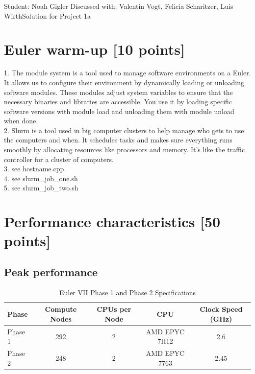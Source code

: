 \documentclass[unicode,11pt,a4paper,oneside,numbers=endperiod,openany]{scrartcl}
\begin{document}
\setassignment
{}

            {Student: Noah Gigler}
            {Discussed with: Valentin Vogt, Felicia Scharitzer, Luis Wirth}{Solution for Project 1a}{}
\newline

\assignmentpolicy

\section{Euler warm-up [10 points]}

1. The module system is a tool used to manage software environments on a Euler. 
It allows us to configure their environment by dynamically loading or unloading software modules. 
These modules adjust system variables to ensure that the necessary binaries and libraries are accessible.
You use it by loading specific software versions with module load and unloading them with module unload when done.
\\
2. Slurm is a tool used in big computer clusters to help manage who gets to use the computers and when. 
It schedules tasks and makes sure everything runs smoothly by allocating resources like processors and memory.
It's like the traffic controller for a cluster of computers.
\\
3.
see hostname.cpp
\\
4.
see slurm\_job\_one.sh
\\
5.
see slurm\_job\_two.sh

\section{Performance characteristics [50 points]}

\subsection{Peak performance}

\begin{table}[ht]
\centering
\caption{Euler VII Phase 1 and Phase 2 Specifications}
\begin{tabular}{|l|c|c|c|c|}
\hline
\textbf{Phase} & \textbf{Compute Nodes} & \textbf{CPUs per Node} & \textbf{CPU} & \textbf{Clock Speed (GHz)} \\ \hline
Phase 1        & 292                    & 2                      & AMD EPYC 7H12 & 2.6                        \\ \hline
Phase 2        & 248                    & 2                      & AMD EPYC 7763 & 2.45                       \\ \hline
\end{tabular}
\end{table}
\end{document}
